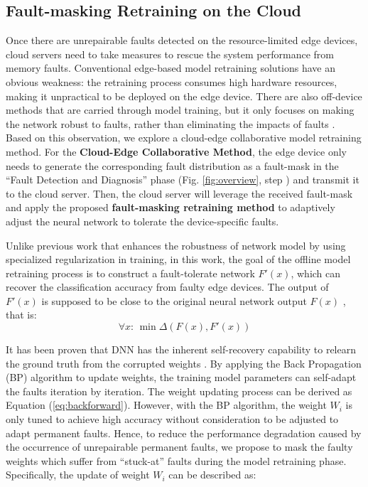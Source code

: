 \subsection{Fault-masking Retraining on the Cloud}
Once there are unrepairable faults detected on the resource-limited edge devices, cloud servers need to take measures to rescue the system performance from memory faults. Conventional edge-based model retraining solutions have an obvious weakness: the retraining process consumes high hardware resources, making it unpractical to be deployed on the edge device. There are also off-device methods that are carried through model training, but it only focuses on making the network robust to faults, rather than eliminating the impacts of faults \cite{7926952}.  Based on this observation, we explore a cloud-edge collaborative model retraining method. For the {\bf Cloud-Edge Collaborative Method}, the edge device only needs to generate the corresponding fault distribution as a fault-mask in the  ``Fault Detection and Diagnosis'' phase (Fig. \ref{fig:overview}, step ) and transmit it to the cloud server.  Then, the cloud server will leverage the received fault-mask and apply the proposed {\bf fault-masking retraining method} to adaptively adjust the neural network to tolerate the device-specific faults.
                                        
Unlike previous work that enhances the robustness of network model by using specialized regularization in training, in this work, the goal of the offline model retraining process is to construct a fault-tolerate network $F'(x)$, which can recover the classification accuracy from faulty edge devices. The output of $F'(x)$ is supposed to be close to the original neural network output $F(x)$ , that is:
\begin{equation}
    \forall x:\,\min \Delta (F(x),F'(x))
\end{equation}
                                                                
It has been proven that DNN has the inherent self-recovery capability to relearn the ground truth from the corrupted weights \cite{8013784}.  By applying the Back Propagation (BP) algorithm to update weights, the training model parameters can self-adapt the faults iteration by iteration. The weight updating process can be derived as Equation (\ref{eq:backforward}). However, with the BP algorithm, the weight $ {W_{i}}$ is only tuned to achieve high accuracy without consideration to be adjusted to adapt permanent faults. Hence, to reduce the performance degradation caused by the occurrence of unrepairable permanent faults, we propose to mask the faulty weights which suffer from ``stuck-at'' faults during the model retraining phase. Specifically, the update of weight ${W_i}$ can be described as:
                                                                            
